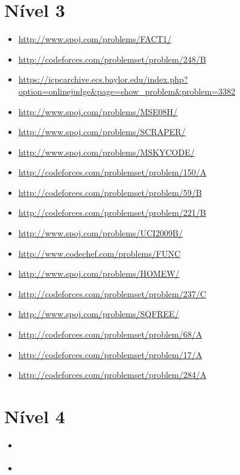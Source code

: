 \section{Nível 3}

\begin{itemize}
\item \url{http://www.spoj.com/problems/FACT1/}
\item \url{http://codeforces.com/problemset/problem/248/B}
\item \url{https://icpcarchive.ecs.baylor.edu/index.php?option=onlinejudge&page=show_problem&problem=3382}
\item \url{http://www.spoj.com/problems/MSE08H/}
\item \url{http://www.spoj.com/problems/SCRAPER/}
\item \url{http://www.spoj.com/problems/MSKYCODE/}
\item \url{http://codeforces.com/problemset/problem/150/A}
\item \url{http://codeforces.com/problemset/problem/59/B}
\item \url{http://codeforces.com/problemset/problem/221/B}
\item \url{http://www.spoj.com/problems/UCI2009B/}
\item \url{http://www.codechef.com/problems/FUNC}
\item \url{http://www.spoj.com/problems/HOMEW/}
\item \url{http://codeforces.com/problemset/problem/237/C}
\item \url{http://www.spoj.com/problems/SQFREE/}
\item \url{http://codeforces.com/problemset/problem/68/A}
\item \url{http://codeforces.com/problemset/problem/17/A}
\item \url{http://codeforces.com/problemset/problem/284/A}
\end{itemize}



\section{Nível 4}

\begin{itemize}
\item \url{}
\item \url{}
\end{itemize}



